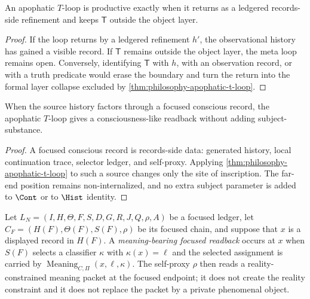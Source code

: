 \begin{corollary}
\label{cor:philosophy-t-loop-productivity}
An apophatic $T$-loop is productive exactly when it returns as a
ledgered records-side refinement and keeps $\mathsf{T}$ outside the
object layer.
\end{corollary}
\begin{proof}
If the loop returns by a ledgered refinement $h'$, the observational
history has gained a visible record. If $\mathsf{T}$ remains outside
the object layer, the meta loop remains open. Conversely, identifying
$\mathsf{T}$ with $h$, with an observation record, or with a truth
predicate would erase the boundary and turn the return into the
formal layer collapse excluded by
\autoref{thm:philosophy-apophatic-t-loop}.
\end{proof}

\begin{corollary}
\label{cor:philosophy-conscious-t-loop-reading}
When the source history factors through a focused conscious record,
the apophatic $T$-loop gives a consciousness-like readback without
adding subject-substance.
\end{corollary}
\begin{proof}
A focused conscious record is records-side data: generated history,
local continuation trace, selector ledger, and self-proxy. Applying
\autoref{thm:philosophy-apophatic-t-loop} to such a source changes
only the site of inscription. The far-end position remains
non-internalized, and no extra subject parameter is added to $\Cont$ or
to $\Hist$ identity.
\end{proof}

\begin{definition}
\label{def:philosophy-meaning-bearing-focused-readback}
Let $L_N=(I,H,\Theta,F,S,D,G,R,J,Q,\rho,A)$ be a focused ledger, let
$C_F=(H(F),\Theta(F),S(F),\rho)$ be its focused chain, and suppose that
$x$ is a displayed record in $H(F)$. A \emph{meaning-bearing focused
readback} occurs at $x$ when $S(F)$ selects a classifier $\kappa$ with
$\kappa(x)=\ell$ and the selected assignment is carried by
$\operatorname{Meaning}_{C,\Pi}(x,\ell,\kappa)$. The self-proxy $\rho$
then reads a reality-constrained meaning packet at the focused
endpoint; it does not create the reality constraint and it does not
replace the packet by a private phenomenal object.
\end{definition}

